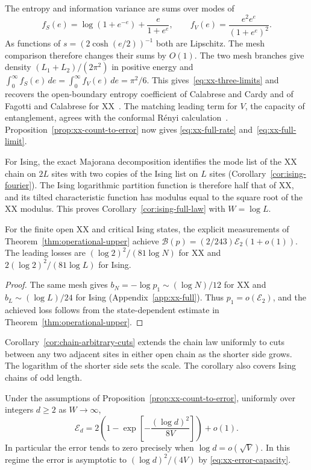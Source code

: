 The entropy and information variance are sums over modes of
\[
 f_S(e)=\log(1+e^{-e})+\frac{e}{1+e^e},\qquad
 f_V(e)=\frac{e^2 e^e}{(1+e^e)^2}.
\]
As functions of $s=(2\cosh(e/2))^{-1}$ both are Lipschitz. The mesh
comparison therefore changes their sums by $O(1)$. The two mesh
branches give density $(L_1+L_2)/(2\pi^2)$ in positive energy and
$\int_0^\infty f_S(e)\,de=\int_0^\infty f_V(e)\,de=\pi^2/6$.
This gives~\eqref{eq:xx-three-limits} and recovers the open-boundary
entropy coefficient of Calabrese and Cardy and of Fagotti and
Calabrese for XX~\cite{CalabreseCardy04,FagottiCalabrese11}.
The matching leading term for $V$, the capacity of entanglement,
agrees with the conformal R\'enyi calculation~\cite{deBoer19,Arias23}.
Proposition~\ref{prop:xx-count-to-error} now gives
\eqref{eq:xx-full-rate} and~\eqref{eq:xx-full-limit}.

For Ising, the exact Majorana decomposition identifies the mode list of
the XX chain on $2L$ sites with two copies of the Ising list on $L$
sites (Corollary~\ref{cor:ising-fourier}). The Ising logarithmic partition
function is therefore half that of XX, and its tilted characteristic
function has modulus equal to the square root of the XX modulus. This
proves Corollary~\ref{cor:ising-full-law} with $W=\log L$.

\begin{corollary}\label{cor:xx-strategy}
For the finite open XX and critical Ising states, the explicit
measurements of Theorem~\ref{thm:operational-upper} achieve
$\mathcal B(p)=(2/243)\mathcal E_2(1+o(1))$. The leading losses are
$(\log2)^2/(81\log N)$ for XX and $2(\log2)^2/(81\log L)$ for Ising.
\end{corollary}

\begin{proof}
The same mesh gives $b_N=-\log p_1\sim(\log N)/12$ for XX and
$b_L\sim(\log L)/24$ for Ising (Appendix~\ref{app:xx-full}). Thus
$p_1=o(\mathcal E_2)$, and the achieved loss follows from the
state-dependent estimate in Theorem~\ref{thm:operational-upper}.
\end{proof}

Corollary~\ref{cor:chain-arbitrary-cuts} extends the chain law uniformly
to cuts between any two adjacent sites in either open chain as the
shorter side grows. The logarithm of the shorter side sets the scale.
The corollary also covers Ising chains of odd length.

\begin{corollary}\label{cor:chain-growing-target}
Under the assumptions of Proposition~\ref{prop:xx-count-to-error},
uniformly over integers $d\ge2$ as $W\to\infty$,
\begin{equation}\label{eq:chain-gaussian-crossover}
 \mathcal E_d=2\left(1-\exp\left[-\frac{(\log d)^2}{8V}\right]\right)+o(1).
\end{equation}
In particular the error tends to zero precisely when $\log d=o(\sqrt V)$.
In this regime the error is asymptotic to $(\log d)^2/(4V)$ by
\eqref{eq:xx-error-capacity}.
\end{corollary}

